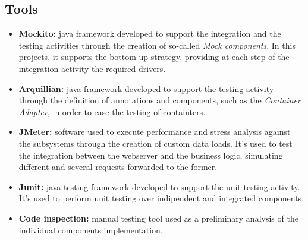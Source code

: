 \subsection{Tools}

\begin{itemize}
	\item \textbf{Mockito:} java framework developed to support the integration and the testing activities through the creation of so-called \textit{Mock components}. In this projects, it supports the bottom-up strategy, providing at each step of the integration activity the required drivers.

	\item \textbf{Arquillian:} java framework developed to support the testing activity through the definition of annotations and components, such as the \textit{Container Adapter}, in order to ease the testing of containters.

	\item \textbf{JMeter:} software used to execute performance and stress analysis against the subsystems through the creation of custom data loads.
It's used to test the integration between the webserver and the business logic, simulating different and several requests forwarded to the former.

	\item \textbf{Junit:} java testing framework developed to support the unit testing activity. It's used to perform unit testing over indipendent and integrated components. 

	\item \textbf{Code inspection:} manual testing tool used as a preliminary analysis of the individual components implementation.
\end{itemize}
